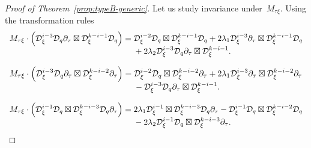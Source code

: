 \documentclass[12pt,a4paper]{amsart}
\theoremstyle{thm}
\theoremstyle{definition}
\newcommand {\Dq}{\cD_q}
\newcommand {\Dxi}{\cD_\xi}
\begin{document}
\begin{proof}[Proof of Theorem~\textup{\ref{prop:typeB-generic}}]
Let us study invariance under~\(M_{\tau\xi}\). Using the transformation rules
\[
\begin{array}{r@{}l}
M_{\tau\xi}\cdot
\left(
\Dxi^{i-3}\Dq\partial_\tau\boxtimes \Dxi^{k-i-1}\Dq
\right)
={}&
\Dxi^{i-2}\Dq\boxtimes \Dxi^{k-i-1}\Dq
+
2\lambda_1
\Dxi^{i-3}\partial_\tau\boxtimes \Dxi^{k-i-1}\Dq
\\
&{}+
2\lambda_2
\Dxi^{i-3}\Dq\partial_\tau\boxtimes \Dxi^{k-i-1}.
\end{array}
\]

\[
\begin{array}{r@{}l}
M_{\tau\xi}\cdot
\left(
\Dxi^{i-3}\Dq\partial_\tau\boxtimes \Dxi^{k-i-2}\partial_\tau
\right)
={}&
\Dxi^{i-2}\Dq\boxtimes \Dxi^{k-i-2}\partial_\tau
+
2\lambda_1
\Dxi^{i-3}\partial_\tau\boxtimes \Dxi^{k-i-2}\partial_\tau
\\
&{}-
\Dxi^{i-3}\Dq\partial_\tau\boxtimes \Dxi^{k-i-1}.
\end{array}
\]

\[
\begin{array}{r@{}l}
M_{\tau\xi}\cdot
\left(
\Dxi^{i-1}\Dq\boxtimes \Dxi^{k-i-3}\Dq\partial_\tau
\right)
={}&
2\lambda_1
\Dxi^{i-1}\boxtimes \Dxi^{k-i-3}\Dq\partial_\tau
-
\Dxi^{i-1}\Dq\boxtimes \Dxi^{k-i-2}\Dq
\\
&{}-
2\lambda_2
\Dxi^{i-1}\Dq\boxtimes \Dxi^{k-i-3}\partial_\tau.
\end{array}
\]


\end{proof}
\end{document}
